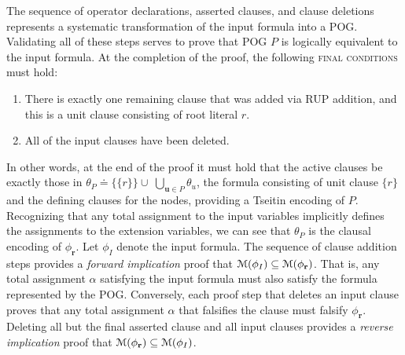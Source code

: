 \documentclass[letterpaper,USenglish,cleveref, autoref, thm-restate]{lipics-v2021}
\newcommand{\assign}{\alpha}
\newcommand{\modelset}{{\cal M}}
\newcommand{\inputformula}{\phi_I}
\newcommand{\pogformula}{\theta_P}
\newcommand{\makenode}[1]{\mathbf{#1}}
\newcommand{\nodeu}{\makenode{u}}
\newcommand{\noder}{\makenode{r}}
\begin{document}

The sequence of operator declarations, asserted clauses, and
clause deletions represents a systematic transformation of the input formula
into a POG\@.  Validating all of these steps serves to prove that
POG $P$ is logically equivalent to the input formula.
At the completion of the proof, the following \textsc{final conditions} must hold:
\begin{enumerate}
\item There is exactly one remaining clause that was added via RUP
  addition, and this is a unit clause consisting of root literal $r$.
\item All of the input clauses have been deleted.
\end{enumerate}
In other words, at the end of the proof it must hold that the active clauses be exactly those
in $\pogformula \doteq \{\{r\}\} \cup \; \bigcup_{\nodeu \in P} \theta_{u}$, the formula consisting
of unit clause $\{r\}$ and the defining clauses for the nodes, providing a Tseitin encoding of $P$. Recognizing that
any total assignment to the input variables implicitly defines the assignments to the extension variables,
we can see that $\pogformula$ is the clausal encoding of $\phi_\noder$.
Let $\inputformula$ denote the input formula.
The sequence of clause addition steps provides a \emph{forward implication} proof that
$\modelset(\inputformula) \subseteq \modelset(\phi_\noder)$.  That is, any total
assignment $\assign$ satisfying the input formula must also satisfy
the formula represented by the POG\@.
Conversely,
each proof step that deletes an input clause proves that any
total assignment $\alpha$ that falsifies the clause must
falsify $\phi_\noder$.  Deleting all but the final asserted clause and all input clauses provides a \emph{reverse implication} proof
that
$\modelset(\phi_\noder) \subseteq \modelset(\inputformula)$.
\end{document}
